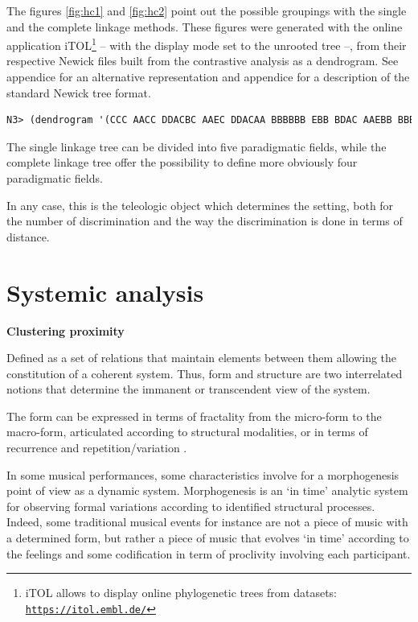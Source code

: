 The figures \ref{fig:hc1} and \ref{fig:hc2} point out the possible groupings with the single and the complete linkage methods. These figures were generated with the online application iTOL\footnote{iTOL allows to display online phylogenetic trees from datasets:\\ \indent \href{https://itol.embl.de/}{\scriptsize{\texttt{https://itol.embl.de/}}}} -- with the display mode set to the unrooted tree --,
from their respective Newick files built from the contrastive analysis as a dendrogram. See appendice  for an alternative representation and appendice  for a description of the standard Newick tree format.

\smallskip
 
\begin{lstlisting}[language=Lisp]
N3> (dendrogram '(CCC AACC DDACBC AAEC DDACAA BBBBBB EBB BDAC AAEBB BBB EE BBBBACDEAAEAA CBB BBEAA AABBAD ABCC ACEC DDACDBAE CDAA ABBEAAEBAD AE DEAA EAD DC CBE ABBC EBD ABDAA EBAA ABBEAABC DBB) 1|2)     
\end{lstlisting}

The single linkage tree can be divided into five paradigmatic fields, while the complete linkage tree offer the possibility to define more obviously four paradigmatic fields. 

In any case, this is the teleologic object which determines the setting, both for the number of discrimination and the way the discrimination is done in terms of distance.

\section{Systemic analysis}

\textbf{Clustering proximity}
\smallskip

Defined as a set of relations that maintain elements between them allowing the constitution of a coherent system. Thus, form and structure are two interrelated notions that determine the immanent or transcendent view of the system.

\smallskip

The form can be expressed in terms of fractality from the micro-form to the macro-form, articulated according to structural modalities, or in terms of recurrence and repetition/variation  \citep{afum}.

In some musical performances, some characteristics involve for a morphogenesis point of view as a dynamic system. Morphogenesis is an `in time' analytic system for observing formal variations according to identified structural processes. Indeed, some traditional musical events for instance are not a piece of music with a determined form, but rather a piece of music that evolves `in time' according to the feelings and some codification in term of proclivity involving each participant.

